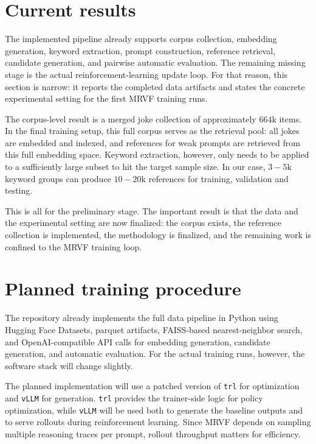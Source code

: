 \section{Current results}

The implemented pipeline already supports corpus collection, embedding generation, keyword extraction, prompt construction, reference retrieval, candidate generation, and pairwise automatic evaluation. The remaining missing stage is the actual reinforcement-learning update loop. For that reason, this section is narrow: it reports the completed data artifacts and states the concrete experimental setting for the first MRVF training runs.

The corpus-level result is a merged joke collection of approximately \(664\text{k}\) items. In the final training setup, this full corpus serves as the retrieval pool: all jokes are embedded and indexed, and references for weak prompts are retrieved from this full embedding space. Keyword extraction, however, only needs to be applied to a sufficiently large subset to hit the target sample size. In our case, \(3-5\text{k}\) keyword groups can produce \(10-20\text{k}\) references for training, validation and testing.

This is all for the preliminary stage. The important result is that the data and the experimental setting are now finalized: the corpus exists, the reference collection is implemented, the methodology is finalized, and the remaining work is confined to the MRVF training loop.

\section{Planned training procedure}

The repository already implements the full data pipeline in Python using Hugging Face Datasets, parquet artifacts, FAISS-based nearest-neighbor search, and OpenAI-compatible API calls for embedding generation, candidate generation, and automatic evaluation. For the actual training runs, however, the software stack will change slightly.

The planned implementation will use a patched version of \texttt{trl} for optimization and \texttt{vLLM} for generation. \texttt{trl} provides the trainer-side logic for policy optimization, while \texttt{vLLM} will be used both to generate the baseline outputs and to serve rollouts during reinforcement learning. Since MRVF depends on sampling multiple reasoning traces per prompt, rollout throughput matters for efficiency.

